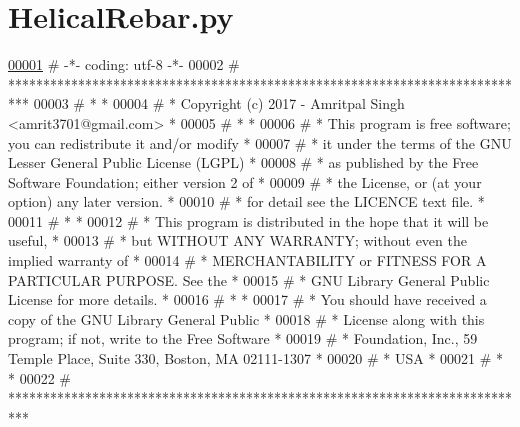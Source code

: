\hypertarget{HelicalRebar_8py_source}{}\section{Helical\+Rebar.\+py}

\begin{DoxyCode}
\hypertarget{HelicalRebar_8py_source.tex_l00001}{}\hyperlink{namespaceHelicalRebar}{00001} \textcolor{comment}{# -*- coding: utf-8 -*-}
00002 \textcolor{comment}{# ***************************************************************************}
00003 \textcolor{comment}{# *                                                                         *}
00004 \textcolor{comment}{# *   Copyright (c) 2017 - Amritpal Singh <amrit3701@gmail.com>             *}
00005 \textcolor{comment}{# *                                                                         *}
00006 \textcolor{comment}{# *   This program is free software; you can redistribute it and/or modify  *}
00007 \textcolor{comment}{# *   it under the terms of the GNU Lesser General Public License (LGPL)    *}
00008 \textcolor{comment}{# *   as published by the Free Software Foundation; either version 2 of     *}
00009 \textcolor{comment}{# *   the License, or (at your option) any later version.                   *}
00010 \textcolor{comment}{# *   for detail see the LICENCE text file.                                 *}
00011 \textcolor{comment}{# *                                                                         *}
00012 \textcolor{comment}{# *   This program is distributed in the hope that it will be useful,       *}
00013 \textcolor{comment}{# *   but WITHOUT ANY WARRANTY; without even the implied warranty of        *}
00014 \textcolor{comment}{# *   MERCHANTABILITY or FITNESS FOR A PARTICULAR PURPOSE.  See the         *}
00015 \textcolor{comment}{# *   GNU Library General Public License for more details.                  *}
00016 \textcolor{comment}{# *                                                                         *}
00017 \textcolor{comment}{# *   You should have received a copy of the GNU Library General Public     *}
00018 \textcolor{comment}{# *   License along with this program; if not, write to the Free Software   *}
00019 \textcolor{comment}{# *   Foundation, Inc., 59 Temple Place, Suite 330, Boston, MA  02111-1307  *}
00020 \textcolor{comment}{# *   USA                                                                   *}
00021 \textcolor{comment}{# *                                                                         *}
00022 \textcolor{comment}{# ***************************************************************************}

\end{DoxyCode}
